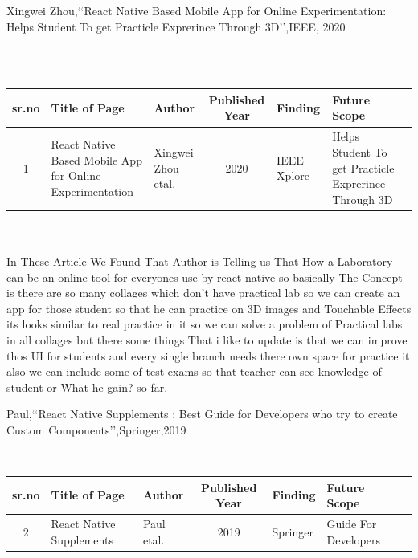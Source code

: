 \documentclass[12pt,a4paper]{report}
\begin{document}
\begin{enumerate}
	 {\bf\item  Xingwei Zhou,\lq\lq React Native Based Mobile App for Online Experimentation: Helps Student To  get Practicle Exprerince Through 3D\rq\rq,IEEE, 2020}\\
\\
\begin{tabular}{ |c | m{2.5cm} | m{2cm}| c | m{2cm} | m{2cm} | c | }

  \hline
  sr.no & Title of Page & Author & Published Year & Finding & Future Scope  \\ 
  \hline
  1 & React Native Based Mobile App for Online Experimentation & Xingwei Zhou etal. &  2020 & IEEE Xplore & Helps Student To  get Practicle Exprerince Through 3D \\
\hline 
  
\end{tabular}
\\
\\
In These Article We Found That Author is Telling us That How a Laboratory can be an online tool for everyones use by react native so basically The Concept is there are so many collages which don't have 
practical lab so we can create an app for those student so that he can practice on 3D images and Touchable Effects its looks similar to real practice in it so we can solve a problem of Practical labs in all collages but there some things That i like to update is that we can improve thos UI for students and every single branch needs there own space for practice it also we can include some of test exams so that teacher can see knowledge of student or What he gain? so far. 

\newpage


{\bf\item Paul,\lq\lq React Native Supplements : Best Guide for Developers who try to create Custom Components\rq\rq,Springer,2019}\\

\begin{tabular}{ |c | m{2.5cm} | m{2cm}| c | m{2cm} | m{2cm} | c | }

 \hline
  sr.no & Title of Page & Author & Published Year & Finding & Future Scope  \\ 
  \hline
  2 & React Native Supplements & Paul etal. &  2019 & Springer & Guide For Developers \\
\hline 
  
\end{tabular}
\\
\\


\end{enumerate}
\end{document}
